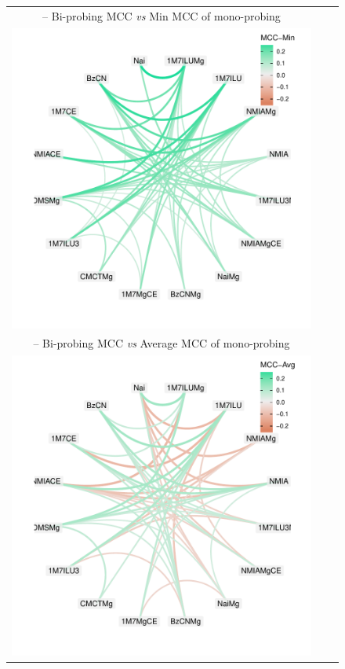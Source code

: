 \documentclass[a4,center,fleqn]{NAR}
\begin{document}
\begin{figure}
	\newcommand{\W}{.725}
	{\centering\begin{tabular}{@{}c@{}c@{}c@{}}
			{\sf {\bfseries A} -- \relsize{-1}Bi-probing MCC \emph{vs} Min MCC of mono-probing}\\
			\includegraphics[width=\W\linewidth,trim=1cm 1cm .8cm .3cm,clip]{graphs/didy/MCC-vs-Min}\\[.5em]
			{\sf {\bfseries B} -- \relsize{-1}Bi-probing MCC \emph{vs} Average MCC of mono-probing}\\
			\includegraphics[width=\W\linewidth,trim=1cm 1cm .8cm .3cm,clip]{graphs/didy/MCC-vs-Avg}\\[.5em]

\end{tabular}}
\end{figure}
\end{document}
